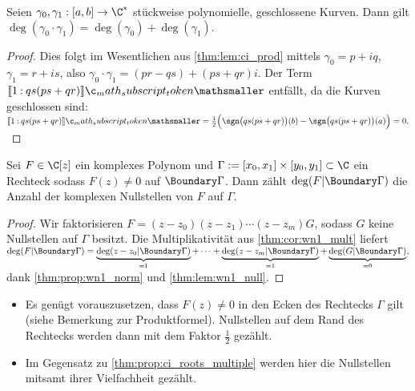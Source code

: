 \documentclass{mythesis}
\begin{document}
\begin{corollary}[Multiplikativität] \label{thm:cor:wn1_mult}
    Seien $\gamma_0, \gamma_1: [a,b] \to \C^*$ stückweise polynomielle, geschlossene Kurven.
    Dann gilt
    \begin{math}
        \deg(\gamma_0 \cdot \gamma_1) = \deg(\gamma_0) + \deg(\gamma_1).
    \end{math}
    \begin{proof}
        Dies folgt im Wesentlichen aus \ref{thm:lem:ci_prod} mittels $\gamma_0 = p + iq$, $\gamma_1 = r + is$, also $\gamma_0\cdot\gamma_1 = (pr-qs) + (ps +qr)i$.
        Der Term $\Index{}{1}{qs(ps+qr)}$ entfällt, da die Kurven geschlossen sind:
        \begin{math}
            \Index{}{1}{qs(ps+qr)}
            = \frac{1}{2}\Big(\sgn\big(qs(ps+qr)\big)(b) - \sgn\big(qs(ps+qr)\big)(a)\Big)
            = 0.
        \end{math}
    \end{proof}
\end{corollary}

\begin{corollary} \label{thm:cor:complex-roots}
    Sei $F \in \C[z]$ ein komplexes Polynom und $\Gamma := [x_0,x_1] \times [y_0, y_1] \subset \C$ ein Rechteck sodass $F(z) \neq 0$ auf $\Boundary\Gamma$.
    Dann zählt $\deg(F|\Boundary\Gamma)$ die Anzahl der komplexen Nullstellen von $F$ auf $\Gamma$.
    \begin{proof}
        Wir faktorisieren $F = (z-z_0)(z-z_1) \dotsb(z-z_m) G$, sodass $G$ keine Nullstellen auf $\Gamma$ besitzt.
        Die Multiplikativität aus \ref{thm:cor:wn1_mult} liefert
        \begin{math}
            \deg(F|\Boundary\Gamma) = \underbrace{\deg(z-z_0|\Boundary\Gamma)}_{=1} + \dotsb + \underbrace{\deg(z-z_m|\Boundary\Gamma)}_{=1} + \underbrace{\deg(G|\Boundary\Gamma)}_{=0},
        \end{math}
        dank \ref{thm:prop:wn1_norm} und \ref{thm:lem:wn1_null}.
    \end{proof}
    \begin{note}
        \begin{itemize}
            \item
                Es genügt vorauszusetzen, dass $F(z) \neq 0$ in den Ecken des Rechtecks $\Gamma$ gilt (siehe Bemerkung zur Produktformel).
                Nullstellen auf dem Rand des Rechtecks werden dann mit dem Faktor $\frac{1}{2}$ gezählt.
            \item
                Im Gegensatz zu \ref{thm:prop:ci_roots_multiple} werden hier die Nullstellen mitsamt ihrer Vielfachheit gezählt.
        \end{itemize}
    \end{note}
\end{corollary}
\end{document}
